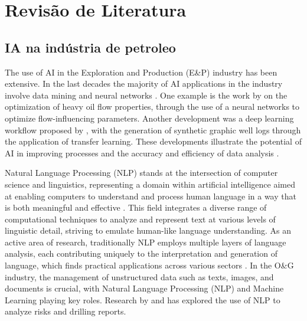 \chapter{Revisão de Literatura} 

    \section{IA na indústria de petroleo}

        The use of AI in the Exploration and Production (E\&P) industry has been extensive. In the last decades the majority of AI applications in the industry involve data mining and neural networks \cite{Bravo2014}. One example is the work by \cite{Gudala2021} on the optimization of heavy oil flow properties, through the use of a neural networks to optimize flow-influencing parameters.
        Another development was a deep learning workflow proposed by \cite{Gohari2024}, with the generation of synthetic graphic well logs through the application of transfer learning. These developments illustrate the potential of AI in improving processes and the accuracy and efficiency of data analysis \cite{Rahmani2021}.
    
        Natural Language Processing (NLP) stands at the intersection of computer science and linguistics, representing a domain within artificial intelligence aimed at enabling computers to understand and process human language in a way that is both meaningful and effective \cite{Liddy2001}. This field integrates a diverse range of computational techniques to analyze and represent text at various levels of linguistic detail, striving to emulate human-like language understanding. As an active area of research, traditionally NLP  employs multiple layers of language analysis, each contributing uniquely to the interpretation and generation of language, which finds practical applications across various sectors \cite{Liddy2001}.      
        In the O\&G industry, the management of unstructured data such as texts, images, and documents is crucial, with Natural Language Processing (NLP) and Machine Learning playing key roles.
        Research by \cite{Antoniak2016} and \cite{Castineira2018} has explored the use of NLP to analyze risks and drilling reports.           
        
        
